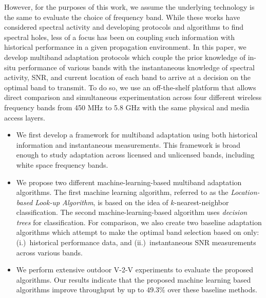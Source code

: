 However, for the purposes of this work, we assume the underlying technology is the same to evaluate the choice of frequency band.
While these works have considered spectral activity and developing protocols and algorithms to 
find spectral holes, less of a focus has been on coupling such information with historical performance in a given 
propagation environment.
In this paper, 
we develop multiband adaptation protocols which couple the prior knowledge of in-situ performance of various bands with the instantaneous knowledge of 
spectral activity, SNR, and current location of each band to arrive at a decision on the optimal band to transmit. To do so, we use an
off-the-shelf platform that allows direct comparison and simultaneous experimentation across four different wireless
frequency bands from 450 MHz to 5.8 GHz with the same physical
and media access layers. 
\begin{itemize}
\item We first develop a framework for multiband adaptation using both historical information and instantaneous measurements. This framework is broad enough to study adaptation across licensed and unlicensed bands, including white space frequency bands.  

\item We propose two different machine-learning-based multiband adaptation algorithms. The 
first machine learning algorithm, referred to as the \emph{Location-based 
Look-up Algorithm}, 
is based on the idea of $k$-nearest-neighbor classification. The second machine-learning-based 
algorithm uses \emph{decision trees} for classification. 
For comparison, we also create two baseline adaptation algorithms which attempt to make the optimal band selection based on only: (i.)~historical 
performance data, and (ii.)~instantaneous SNR measurements across 
various bands. 


\item We perform extensive outdoor V-2-V experiments to evaluate the proposed algorithms.
Our results indicate that the proposed machine learning based algorithms improve
throughput by up to $49.3\%$ over these baseline methods.

\end{itemize}





